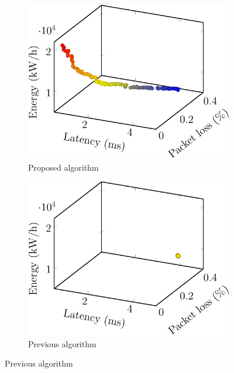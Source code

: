 \begin{figure}[t!]
    \centering
    \begin{subfigure}[b]{0.32\linewidth}
        \includegraphics[width=\textwidth]{graphs/comparison/qm-crop}
        \caption{Proposed algorithm}
    \end{subfigure}
    \begin{subfigure}[b]{0.32\linewidth}
        \includegraphics[width=\textwidth]{graphs/comparison/previous-crop}
        \caption{Previous algorithm}
    \end{subfigure}

    \vspace{1em}


\end{figure}

